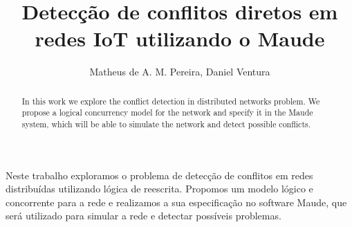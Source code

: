 \documentclass[12pt]{article}
\title{Detecção de conflitos diretos em redes IoT utilizando o Maude}
\author{Matheus de A. M. Pereira\inst{1}, Daniel Ventura\inst{1}}
\begin{document}
 

\maketitle

\begin{abstract}
  In this work we explore the conflict detection in distributed networks problem. We propose a logical concurrency model for the network and specify it in the Maude system, which will be able to simulate the network and detect possible conflicts.
\end{abstract}
     
\begin{resumo} 
  Neste trabalho exploramos o problema de detecção de conflitos em redes distribuídas utilizando lógica de reescrita. Propomos um modelo lógico e concorrente para a rede e realizamos a sua especificação no software Maude, que será utilizado para simular a rede e detectar possíveis problemas.
\end{resumo}












\pagebreak
\appendix





\end{document}
